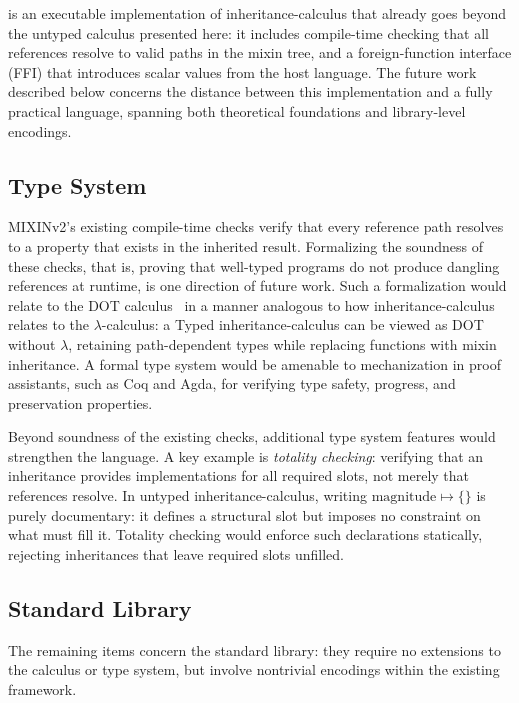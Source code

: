  is an executable implementation of inheritance-calculus
that already goes beyond the untyped calculus presented here:
it includes compile-time checking that all references resolve to
valid paths in the mixin tree, and a foreign-function interface (FFI)
that introduces scalar values from the host language.
The future work described below concerns the distance between this
implementation and a fully practical language, spanning both
theoretical foundations and library-level encodings.

\subsection{Type System}
MIXINv2's existing compile-time checks verify that every
reference path resolves to a property that exists in the inherited
result. Formalizing the soundness of these checks, that is, proving that
well-typed programs do not produce dangling references at
runtime, is one direction of future work.
Such a formalization would relate to the DOT
calculus~\cite{amin2016-dependent-object-types} in a manner analogous to how
inheritance-calculus relates to the $\lambda$-calculus: a Typed
inheritance-calculus can be viewed as DOT without $\lambda$, retaining
path-dependent types while replacing functions with
mixin inheritance.
A formal type system would be amenable to mechanization in proof
assistants, such as Coq and Agda, for verifying type safety, progress, and
preservation properties.

Beyond soundness of the existing checks, additional type system
features would strengthen the language.
A key example is \emph{totality checking}: verifying that an
inheritance provides implementations for all required slots, not
merely that references resolve.
In untyped inheritance-calculus, writing $\mathrm{magnitude} \mapsto \{\}$
is purely documentary: it defines a structural slot but imposes no
constraint on what must fill it.
Totality checking would enforce such declarations statically,
rejecting inheritances that leave required slots unfilled.

\subsection{Standard Library}
The remaining items concern the standard library: they require
no extensions to the calculus or type system, but involve nontrivial
encodings within the existing framework.

